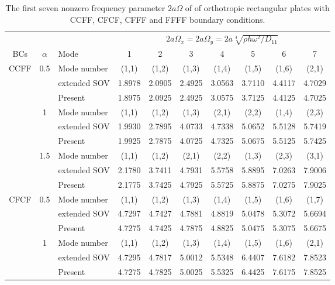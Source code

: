 \documentclass[preprint,12pt]{elsarticle}
\begin{document}
\begin{table}[!htbp] 
	\centering
	\caption{The first seven nonzero frequency parameter $2a\Omega$ of of orthotropic rectangular plates with CCFF, CFCF, CFFF and FFFF boundary conditions.}
	\begin{tabular}{c c l c c c c c c c}
		\toprule
		\multicolumn{3}{c}{} & \multicolumn{7}{c}{$2a\Omega_x=2a\Omega_y=2a\sqrt[4]{\rho h \omega^2/D_{11}}$} \\ 
		\cmidrule(lr){4-10}
		BCs & $\alpha$ & Mode & 1 & 2 & 3 & 4 & 5 & 6 & 7 \\
		\midrule
		CCFF & 0.5 & Mode number   & (1,1) & (1,2) & (1,3) & (1,4) & (1,5) & (1,6) & (2,1) \\
		&     & extended SOV \Citealp{xing2020extended}   & 1.8978 & 2.0905 & 2.4925 & 3.0563 & 3.7110 & 4.4117 & 4.7029 \\
		&     & Present       & 1.8975 & 2.0925 & 2.4925 & 3.0575 & 3.7125 & 4.4125 & 4.7025 \\
		& 1   & Mode number  & (1,1) & (1,2) & (1,3) & (2,1) & (2,2) & (1,4) & (2,3) \\
		&     & extended SOV \Citealp{xing2020extended}   & 1.9930 & 2.7895 & 4.0733 & 4.7338 & 5.0652 & 5.5128 & 5.7419 \\
		&     & Present       & 1.9925 & 2.7875 & 4.0725 & 4.7325 & 5.0675 & 5.5125 & 5.7425 \\
		& 1.5 & Mode number  & (1,1) & (1,2) & (2,1) & (2,2) & (1,3) & (2,3) & (3,1) \\
		&     & extended SOV \Citealp{xing2020extended}   & 2.1780 & 3.7411 & 4.7931 & 5.5758 & 5.8895 & 7.0263 & 7.9006 \\
		&     & Present       & 2.1775 & 3.7425 & 4.7925 & 5.5725 & 5.8875 & 7.0275 & 7.9025 \\
		CFCF & 0.5 & Mode number   & (1,1) & (1,2) & (1,3) & (1,4) & (1,5) & (1,6) & (1,7) \\
		&     & extended SOV \Citealp{xing2020extended}   & 4.7297 & 4.7427 & 4.7881 & 4.8819 & 5.0478 & 5.3072 & 5.6694 \\
		&     & Present       & 4.7275 & 4.7425 & 4.7875 & 4.8825 & 5.0475 & 5.3075 & 5.6675 \\
		& 1   & Mode number  & (1,1) & (1,2) & (1,3) & (1,4) & (1,5) & (1,6) & (2,1) \\
		&     & extended SOV \Citealp{xing2020extended}   & 4.7295 & 4.7817 & 5.0012 & 5.5348 & 6.4407 & 7.6182 & 7.8523 \\
		&     & Present       & 4.7275 & 4.7825 & 5.0025 & 5.5325 & 6.4425 & 7.6175 & 7.8525 \\

\end{tabular}
\end{table}
\end{document}
